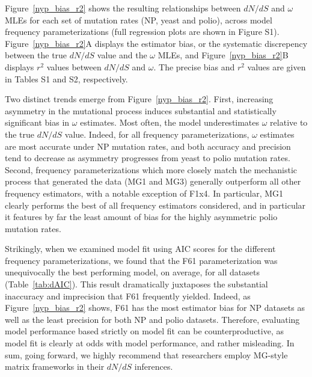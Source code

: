 \documentclass[11pt]{article}
\begin{document}
Figure~\ref{nyp_bias_r2} shows the resulting relationships between $dN/dS$ and $\omega$ MLEs for each set of mutation rates (NP, yeast and polio), across model frequency parameterizations (full regression plots are shown in Figure S1). Figure~\ref{nyp_bias_r2}A displays the estimator bias, or the systematic discrepency between the true $dN/dS$ value and the $\omega$ MLEs, and Figure~\ref{nyp_bias_r2}B displays $r^2$ values between $dN/dS$ and $\omega$. The precise bias and $r^2$ values are given in Tables S1 and S2, respectively.

Two distinct trends emerge from Figure~\ref{nyp_bias_r2}. First, increasing asymmetry in the mutational process induces substantial and statistically significant bias in $\omega$ estimates. Most often, the model underestimates $\omega$ relative to the true $dN/dS$ value.  Indeed, for all frequency parameterizations, $\omega$ estimates are most accurate under NP mutation rates, and both accuracy and precision tend to decrease as asymmetry progresses from yeast to polio mutation rates. Second, frequency parameterizations which more closely match the mechanistic process that generated the data (MG1 and MG3) generally outperform all other frequency estimators, with a notable exception of F1x4. In particular, MG1 clearly performs the best of all frequency estimators considered, and in particular it features by far the least amount of bias for the highly asymmetric polio mutation rates.


Strikingly, when we examined model fit using AIC scores \cite{Akaike1974} for the different frequency parameterizations, we found that the F61 parameterization was unequivocally the best performing model, on average, for all datasets (Table~\ref{tab:dAIC}). This result dramatically juxtaposes the substantial inaccuracy and imprecision that F61 frequently yielded. Indeed, as Figure~\ref{nyp_bias_r2} shows, F61 has the most estimator bias for NP datasets as well as the least precision for both NP and polio datasets. Therefore, evaluating model performance based strictly on model fit can be counterproductive, as model fit is clearly at odds with model performance, and rather misleading. In sum, going forward, we highly recommend that researchers employ MG-style matrix frameworks in their $dN/dS$ inferences.
\end{document}
